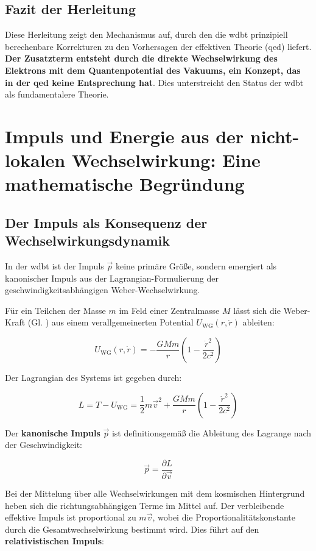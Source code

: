 \section{Fazit der Herleitung}
Diese Herleitung zeigt den Mechanismus auf, durch den die \gls{wdbt} prinzipiell berechenbare Korrekturen zu den Vorhersagen der effektiven Theorie (\gls{qed}) liefert. \textbf{Der Zusatzterm entsteht durch die
direkte Wechselwirkung des Elektrons mit dem Quantenpotential des Vakuums, ein Konzept, das in der \gls{qed} keine Entsprechung hat}. Dies unterstreicht den Status der \gls{wdbt} als fundamentalere Theorie.

\chapter{Impuls und Energie aus der nicht-lokalen Wechselwirkung: Eine mathematische Begründung}
\section{Der Impuls als Konsequenz der Wechselwirkungsdynamik}
In der \gls{wdbt} ist der Impuls $\vec{p}$ keine primäre Größe, sondern emergiert als kanonischer Impuls aus der Lagrangian-Formulierung der geschwindigkeitsabhängigen Weber-Wechselwirkung.

Für ein Teilchen der Masse $m$ im Feld einer Zentralmasse $M$ lässt sich die Weber-Kraft (Gl. ) aus einem verallgemeinerten Potential $U_\text{WG}(r,\dot{r})$ ableiten:

\begin{equation}
    U_{\mathrm{WG}}(r, \dot{r}) = -\frac{GMm}{r} \left( 1 - \frac{\dot{r}^2}{2c^2} \right)
\end{equation}

Der Lagrangian des Systems ist gegeben durch:

\begin{equation}
    L = T - U_{\mathrm{WG}} = \frac{1}{2}m\vec{v}^2 + \frac{GMm}{r} \left( 1 - \frac{\dot{r}^2}{2c^2} \right)
\end{equation}

Der \textbf{kanonische Impuls} $\vec{p}$ ist definitionsgemäß die Ableitung des Lagrange nach der Geschwindigkeit:

\begin{equation}
    \vec{p} = \frac{\partial L}{\partial \vec{v}}
\end{equation}

Bei der Mittelung über alle Wechselwirkungen mit dem kosmischen Hintergrund heben sich die richtungsabhängigen Terme im Mittel auf. Der verbleibende effektive Impuls ist proportional zu $m\vec{v}$, wobei
die Proportionalitätskonstante durch die Gesamtwechselwirkung bestimmt wird. Dies führt auf den \textbf{relativistischen Impuls}:

